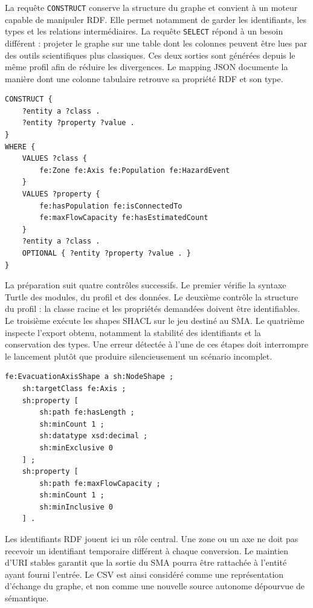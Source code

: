 \documentclass{article}
\begin{document}
La requête \texttt{CONSTRUCT} conserve la structure du graphe et convient à un moteur capable de manipuler RDF. Elle permet notamment de garder les identifiants, les types et les relations intermédiaires. La requête \texttt{SELECT} répond à un besoin différent : projeter le graphe sur une table dont les colonnes peuvent être lues par des outils scientifiques plus classiques. Ces deux sorties sont générées depuis le même profil afin de réduire les divergences. Le mapping JSON documente la manière dont une colonne tabulaire retrouve sa propriété RDF et son type.

\begin{lstlisting}[language=SPARQL,caption={Structure simplifiée de la requête d'extraction générée}]
CONSTRUCT {
    ?entity a ?class .
    ?entity ?property ?value .
}
WHERE {
    VALUES ?class {
        fe:Zone fe:Axis fe:Population fe:HazardEvent
    }
    VALUES ?property {
        fe:hasPopulation fe:isConnectedTo
        fe:maxFlowCapacity fe:hasEstimatedCount
    }
    ?entity a ?class .
    OPTIONAL { ?entity ?property ?value . }
}
\end{lstlisting}

La préparation suit quatre contrôles successifs. Le premier vérifie la syntaxe Turtle des modules, du profil et des données. Le deuxième contrôle la structure du profil : la classe racine et les propriétés demandées doivent être identifiables. Le troisième exécute les shapes SHACL sur le jeu destiné au SMA. Le quatrième inspecte l'export obtenu, notamment la stabilité des identifiants et la conservation des types. Une erreur détectée à l'une de ces étapes doit interrompre le lancement plutôt que produire silencieusement un scénario incomplet.

\begin{lstlisting}[language=Turtle,caption={Exemple de contrainte SHACL appliquée aux axes}]
fe:EvacuationAxisShape a sh:NodeShape ;
    sh:targetClass fe:Axis ;
    sh:property [
        sh:path fe:hasLength ;
        sh:minCount 1 ;
        sh:datatype xsd:decimal ;
        sh:minExclusive 0
    ] ;
    sh:property [
        sh:path fe:maxFlowCapacity ;
        sh:minCount 1 ;
        sh:minInclusive 0
    ] .
\end{lstlisting}

Les identifiants RDF jouent ici un rôle central. Une zone ou un axe ne doit pas recevoir un identifiant temporaire différent à chaque conversion. Le maintien d'URI stables garantit que la sortie du SMA pourra être rattachée à l'entité ayant fourni l'entrée. Le CSV est ainsi considéré comme une représentation d'échange du graphe, et non comme une nouvelle source autonome dépourvue de sémantique.
\end{document}
